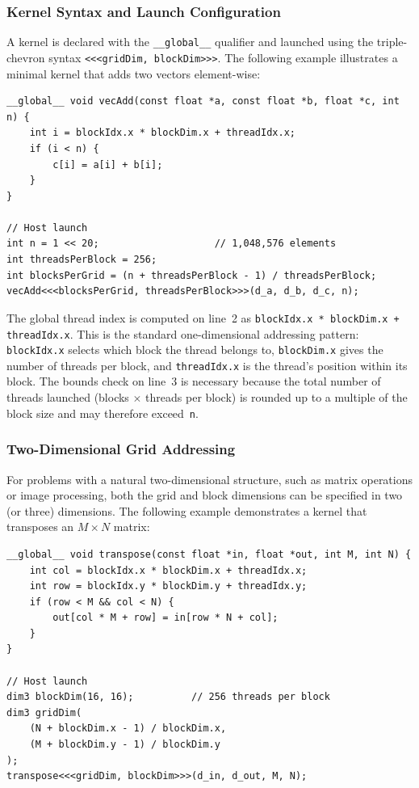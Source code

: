 \subsubsection{Kernel Syntax and Launch Configuration}

A kernel is declared with the \lstinline[language=CUDA]{__global__} qualifier and launched using the triple-chevron syntax \texttt{<<<gridDim, blockDim>>>}. The following example illustrates a minimal kernel that adds two vectors element-wise:

\begin{lstlisting}[language=CUDA, caption={Element-wise vector addition kernel and its host-side launch.}, label={lst:vecadd}]
__global__ void vecAdd(const float *a, const float *b, float *c, int n) {
    int i = blockIdx.x * blockDim.x + threadIdx.x;
    if (i < n) {
        c[i] = a[i] + b[i];
    }
}

// Host launch
int n = 1 << 20;                    // 1,048,576 elements
int threadsPerBlock = 256;
int blocksPerGrid = (n + threadsPerBlock - 1) / threadsPerBlock;
vecAdd<<<blocksPerGrid, threadsPerBlock>>>(d_a, d_b, d_c, n);
\end{lstlisting}

The global thread index is computed on line~2 as \lstinline[language=CUDA]{blockIdx.x * blockDim.x + threadIdx.x}. This is the standard one-dimensional addressing pattern: \texttt{blockIdx.x} selects which block the thread belongs to, \texttt{blockDim.x} gives the number of threads per block, and \texttt{threadIdx.x} is the thread's position within its block. The bounds check on line~3 is necessary because the total number of threads launched (blocks $\times$ threads per block) is rounded up to a multiple of the block size and may therefore exceed~\texttt{n}.

\subsubsection{Two-Dimensional Grid Addressing}

For problems with a natural two-dimensional structure, such as matrix operations or image processing, both the grid and block dimensions can be specified in two (or three) dimensions. The following example demonstrates a kernel that transposes an $M \times N$ matrix:

\begin{lstlisting}[language=CUDA, caption={Matrix transpose using two-dimensional grid and block addressing.}, label={lst:transpose-2d}]
__global__ void transpose(const float *in, float *out, int M, int N) {
    int col = blockIdx.x * blockDim.x + threadIdx.x;
    int row = blockIdx.y * blockDim.y + threadIdx.y;
    if (row < M && col < N) {
        out[col * M + row] = in[row * N + col];
    }
}

// Host launch
dim3 blockDim(16, 16);          // 256 threads per block
dim3 gridDim(
    (N + blockDim.x - 1) / blockDim.x,
    (M + blockDim.y - 1) / blockDim.y
);
transpose<<<gridDim, blockDim>>>(d_in, d_out, M, N);
\end{lstlisting}

